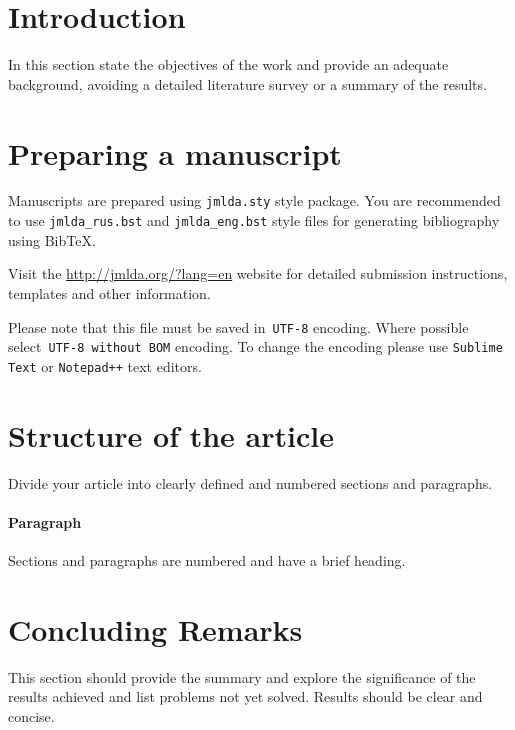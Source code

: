 \documentclass[12pt, twoside]{article}
\begin{document}

\maketitle
\linenumbers

\section{Introduction}
\noindent %
In this section state the objectives of the work and provide an adequate background, avoiding a detailed literature survey or a summary of the results.

\section{Preparing a manuscript}
\noindent
Manuscripts are prepared using \verb'jmlda.sty' style package.
You are recommended to use \verb'jmlda_rus.bst' and \verb'jmlda_eng.bst' style files for generating bibliography using Bib\TeX.

Visit the \url{http://jmlda.org/?lang=en} website for detailed submission instructions, templates and other information.

Please note that this file must be saved in~\verb'UTF-8' encoding. Where possible select~\verb'UTF-8 without BOM' encoding. 
To change the encoding please use \verb'Sublime Text' or \verb'Notepad++' text editors.

\section{Structure of the article}
\noindent
Divide your article into clearly defined and numbered sections and paragraphs.

\paragraph{Paragraph}
\noindent
Sections and paragraphs are numbered and have a brief heading.

\section{Concluding Remarks}
This section should provide the summary and explore the significance of the results achieved and list problems not yet solved.
Results should be clear and concise.
\end{document}

